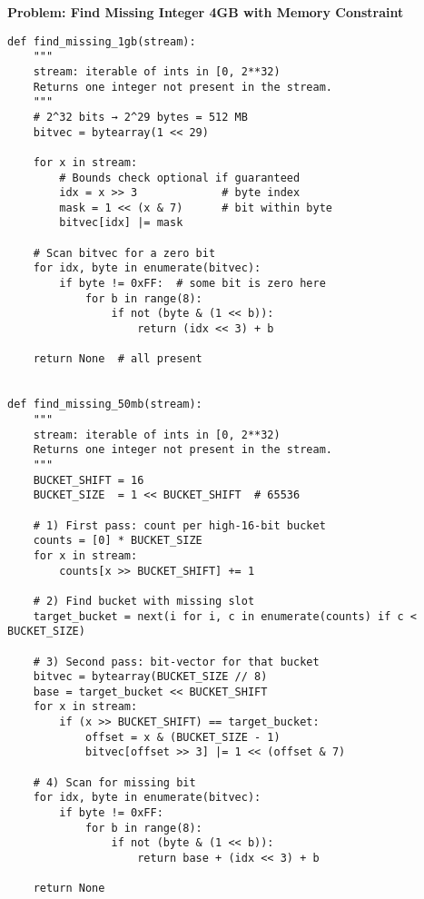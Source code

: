 \noindent\textbf{Problem: Find Missing Integer 4GB with Memory Constraint}
\begin{verbatim}
def find_missing_1gb(stream):
    """
    stream: iterable of ints in [0, 2**32)
    Returns one integer not present in the stream.
    """
    # 2^32 bits → 2^29 bytes = 512 MB
    bitvec = bytearray(1 << 29)

    for x in stream:
        # Bounds check optional if guaranteed
        idx = x >> 3             # byte index
        mask = 1 << (x & 7)      # bit within byte
        bitvec[idx] |= mask

    # Scan bitvec for a zero bit
    for idx, byte in enumerate(bitvec):
        if byte != 0xFF:  # some bit is zero here
            for b in range(8):
                if not (byte & (1 << b)):
                    return (idx << 3) + b

    return None  # all present


def find_missing_50mb(stream):
    """
    stream: iterable of ints in [0, 2**32)
    Returns one integer not present in the stream.
    """
    BUCKET_SHIFT = 16
    BUCKET_SIZE  = 1 << BUCKET_SHIFT  # 65536

    # 1) First pass: count per high-16-bit bucket
    counts = [0] * BUCKET_SIZE
    for x in stream:
        counts[x >> BUCKET_SHIFT] += 1

    # 2) Find bucket with missing slot
    target_bucket = next(i for i, c in enumerate(counts) if c < BUCKET_SIZE)

    # 3) Second pass: bit-vector for that bucket
    bitvec = bytearray(BUCKET_SIZE // 8)
    base = target_bucket << BUCKET_SHIFT
    for x in stream:
        if (x >> BUCKET_SHIFT) == target_bucket:
            offset = x & (BUCKET_SIZE - 1)
            bitvec[offset >> 3] |= 1 << (offset & 7)

    # 4) Scan for missing bit
    for idx, byte in enumerate(bitvec):
        if byte != 0xFF:
            for b in range(8):
                if not (byte & (1 << b)):
                    return base + (idx << 3) + b

    return None
\end{verbatim}
% 
